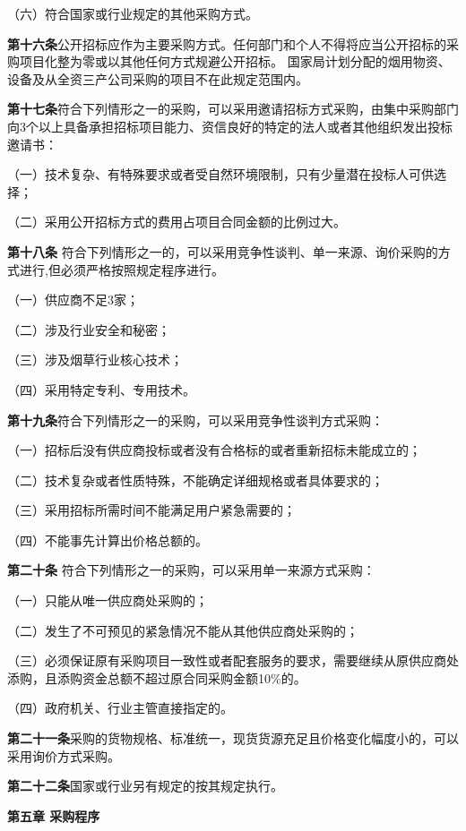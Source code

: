 （六）符合国家或行业规定的其他采购方式。

\textbf{第十六条}\quad  公开招标应作为主要采购方式。任何部门和个人不得将应当公开招标的采购项目化整为零或以其他任何方式规避公开招标。
国家局计划分配的烟用物资、设备及从全资三产公司采购的项目不在此规定范围内。

\textbf{第十七条}\quad  符合下列情形之一的采购，可以采用邀请招标方式采购，由集中采购部门向3个以上具备承担招标项目能力、资信良好的特定的法人或者其他组织发出投标邀请书：

    （一）技术复杂、有特殊要求或者受自然环境限制，只有少量潜在投标人可供选择；

    （二）采用公开招标方式的费用占项目合同金额的比例过大。

\textbf{ 第十八条} \quad 符合下列情形之一的，可以采用竞争性谈判、单一来源、询价采购的方式进行,但必须严格按照规定程序进行。

（一）供应商不足3家；

（二）涉及行业安全和秘密；

（三）涉及烟草行业核心技术；

（四）采用特定专利、专用技术。

\textbf{第十九条}\quad  符合下列情形之一的采购，可以采用竞争性谈判方式采购：

    （一）招标后没有供应商投标或者没有合格标的或者重新招标未能成立的；

    （二）技术复杂或者性质特殊，不能确定详细规格或者具体要求的；

    （三）采用招标所需时间不能满足用户紧急需要的；

    （四）不能事先计算出价格总额的。

  \textbf{第二十条} \quad 符合下列情形之一的采购，可以采用单一来源方式采购：

     （一）只能从唯一供应商处采购的；

    （二）发生了不可预见的紧急情况不能从其他供应商处采购的；

（三）必须保证原有采购项目一致性或者配套服务的要求，需要继续从原供应商处添购，且添购资金总额不超过原合同采购金额10\%的。

（四）政府机关、行业主管直接指定的。

\textbf{第二十一条}\quad  采购的货物规格、标准统一，现货货源充足且价格变化幅度小的，可以采用询价方式采购。

\textbf{第二十二条}\quad  国家或行业另有规定的按其规定执行。

\begin{center}
\textbf{第五章 \quad  采购程序}
\end{center}

